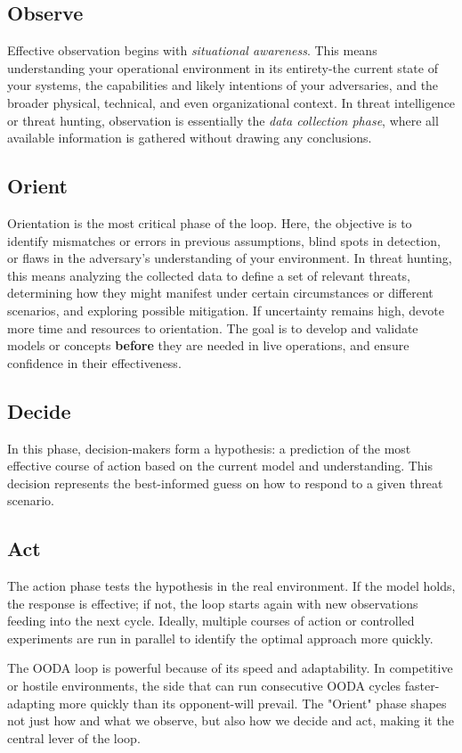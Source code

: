 \subsection{Observe}
Effective observation begins with \textit{situational awareness}. This means understanding your operational environment in its entirety-the current state of your systems, the capabilities and likely intentions of your adversaries, and the broader physical, technical, and even organizational context. In threat intelligence or threat hunting, observation is essentially the \textit{data collection phase}, where all available information is gathered without drawing any conclusions.

\subsection{Orient}
Orientation is the most critical phase of the loop. Here, the objective is to identify mismatches or errors in previous assumptions, blind spots in detection, or flaws in the adversary's understanding of your environment. In threat hunting, this means analyzing the collected data to define a set of relevant threats, determining how they might manifest under certain circumstances or different scenarios, and exploring possible mitigation. If uncertainty remains high, devote more time and resources to orientation. The goal is to develop and validate models or concepts \textbf{before} they are needed in live operations, and ensure confidence in their effectiveness.

\subsection{Decide}
In this phase, decision-makers form a hypothesis: a prediction of the most effective course of action based on the current model and understanding. This decision represents the best-informed guess on how to respond to a given threat scenario.

\subsection{Act}
The action phase tests the hypothesis in the real environment. If the model holds, the response is effective; if not, the loop starts again with new observations feeding into the next cycle. Ideally, multiple courses of action or controlled experiments are run in parallel to identify the optimal approach more quickly.

The OODA loop is powerful because of its speed and adaptability. In competitive or hostile environments, the side that can run consecutive OODA cycles faster-adapting more quickly than its opponent-will prevail. The "Orient" phase shapes not just how and what we observe, but also how we decide and act, making it the central lever of the loop.

